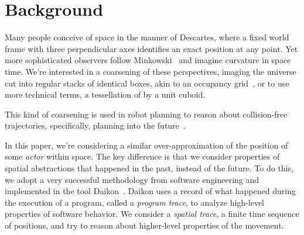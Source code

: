 \section{Background}
\label{sec:background}

Many people conceive of space in the manner of Descartes, where a fixed world frame with three perpendicular axes identifies an exact position at any point.  
Yet more sophisticated observers follow Minkowski~\cite{minkowski1952space} and imagine curvature in space time.
We're interested in a coarsening of these perspectives, imaging the universe cut into regular stacks of identical boxes, akin to an occupancy grid~\cite{moravec1985high}, or to use more technical terms, a tessellation of \rthree by a unit cuboid.



This kind of coarsening is used in robot planning to reason about collision-free trajectories, specifically, planning into the future~\cite{siegwart2011introduction}.

In this paper, we're considering a similar over-approximation of the position of some \emph{actor} within space. 
The key difference is that we consider properties of spatial abstractions that happened in the past, instead of the future.
To do this, we adopt a very successful methodology from software engineering and implemented in the tool Daikon~\cite{kataoka2001automated}.
Daikon uses a record of what happened during the execution of a program, called a \emph{program trace}, to analyze high-level properties of software behavior.
We consider a \emph{spatial trace}, a finite time sequence of positions, and try to reason about higher-level properties of the movement.


